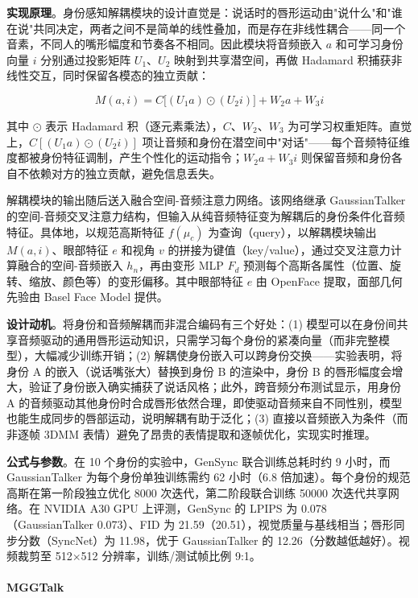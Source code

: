 \textbf{实现原理}。身份感知解耦模块的设计直觉是：说话时的唇形运动由"说什么"和"谁在说"共同决定，两者之间不是简单的线性叠加，而是存在非线性耦合——同一个音素，不同人的嘴形幅度和节奏各不相同。因此模块将音频嵌入 $a$ 和可学习身份向量 $i$ 分别通过投影矩阵 $U_1$、$U_2$ 映射到共享潜空间，再做 Hadamard 积捕获非线性交互，同时保留各模态的独立贡献：

\begin{equation}
    M(a, i) = C\big[(U_1 a) \odot (U_2 i)\big] + W_2 a + W_3 i
\end{equation}

其中 $\odot$ 表示 Hadamard 积（逐元素乘法），$C$、$W_2$、$W_3$ 为可学习权重矩阵。直觉上，$C[(U_1 a) \odot (U_2 i)]$ 项让音频和身份在潜空间中"对话"——每个音频特征维度都被身份特征调制，产生个性化的运动指令；$W_2 a + W_3 i$ 则保留音频和身份各自不依赖对方的独立贡献，避免信息丢失。

解耦模块的输出随后送入融合空间-音频注意力网络。该网络继承 GaussianTalker 的空间-音频交叉注意力结构，但输入从纯音频特征变为解耦后的身份条件化音频特征。具体地，以规范高斯特征 $f(\mu_c)$ 为查询（query），以解耦模块输出 $M(a,i)$、眼部特征 $e$ 和视角 $v$ 的拼接为键值（key/value），通过交叉注意力计算融合的空间-音频嵌入 $h_n$，再由变形 MLP $F_d$ 预测每个高斯各属性（位置、旋转、缩放、颜色等）的变形偏移。其中眼部特征 $e$ 由 OpenFace 提取，面部几何先验由 Basel Face Model 提供。

\textbf{设计动机}。将身份和音频解耦而非混合编码有三个好处：(1) 模型可以在身份间共享音频驱动的通用唇形运动知识，只需学习每个身份的紧凑向量（而非完整模型），大幅减少训练开销；(2) 解耦使身份嵌入可以跨身份交换——实验表明，将身份 A 的嵌入（说话嘴张大）替换到身份 B 的渲染中，身份 B 的唇形幅度会增大，验证了身份嵌入确实捕获了说话风格；此外，跨音频分布测试显示，用身份 A 的音频驱动其他身份时合成唇形依然合理，即使驱动音频来自不同性别，模型也能生成同步的唇部运动，说明解耦有助于泛化；(3) 直接以音频嵌入为条件（而非逐帧 3DMM 表情）避免了昂贵的表情提取和逐帧优化，实现实时推理。

\textbf{公式与参数}。在 10 个身份的实验中，GenSync 联合训练总耗时约 9 小时，而 GaussianTalker 为每个身份单独训练需约 62 小时（6.8 倍加速）。每个身份的规范高斯在第一阶段独立优化 8000 次迭代，第二阶段联合训练 50000 次迭代共享网络。在 NVIDIA A30 GPU 上评测，GenSync 的 LPIPS 为 0.078（GaussianTalker 0.073）、FID 为 21.59（20.51），视觉质量与基线相当；唇形同步分数（SyncNet）为 11.98，优于 GaussianTalker 的 12.26（分数越低越好）。视频裁剪至 512$\times$512 分辨率，训练/测试帧比例 9:1。

\paragraph{MGGTalk}

